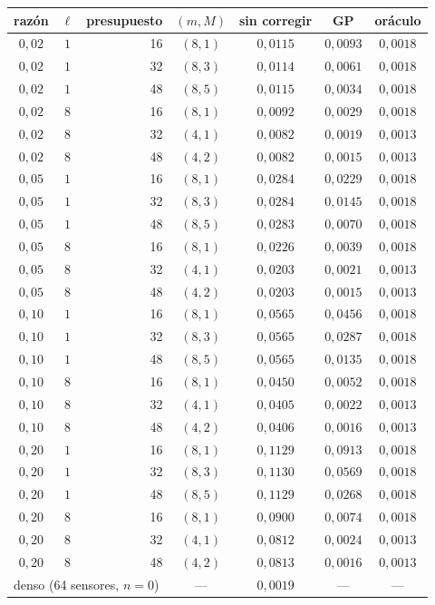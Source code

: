\begin{tabular}{ccrcccc}
\toprule
razón & $\ell$ & presupuesto & $(m, M)$ & sin corregir & GP & oráculo \\
\midrule
$0{,}02$ & $1$ & 16 & $(8, 1)$ & $0{,}0115$ & $0{,}0093$ & $0{,}0018$ \\
$0{,}02$ & $1$ & 32 & $(8, 3)$ & $0{,}0114$ & $0{,}0061$ & $0{,}0018$ \\
$0{,}02$ & $1$ & 48 & $(8, 5)$ & $0{,}0115$ & $0{,}0034$ & $0{,}0018$ \\
$0{,}02$ & $8$ & 16 & $(8, 1)$ & $0{,}0092$ & $0{,}0029$ & $0{,}0018$ \\
$0{,}02$ & $8$ & 32 & $(4, 1)$ & $0{,}0082$ & $0{,}0019$ & $0{,}0013$ \\
$0{,}02$ & $8$ & 48 & $(4, 2)$ & $0{,}0082$ & $0{,}0015$ & $0{,}0013$ \\
$0{,}05$ & $1$ & 16 & $(8, 1)$ & $0{,}0284$ & $0{,}0229$ & $0{,}0018$ \\
$0{,}05$ & $1$ & 32 & $(8, 3)$ & $0{,}0284$ & $0{,}0145$ & $0{,}0018$ \\
$0{,}05$ & $1$ & 48 & $(8, 5)$ & $0{,}0283$ & $0{,}0070$ & $0{,}0018$ \\
$0{,}05$ & $8$ & 16 & $(8, 1)$ & $0{,}0226$ & $0{,}0039$ & $0{,}0018$ \\
$0{,}05$ & $8$ & 32 & $(4, 1)$ & $0{,}0203$ & $0{,}0021$ & $0{,}0013$ \\
$0{,}05$ & $8$ & 48 & $(4, 2)$ & $0{,}0203$ & $0{,}0015$ & $0{,}0013$ \\
$0{,}10$ & $1$ & 16 & $(8, 1)$ & $0{,}0565$ & $0{,}0456$ & $0{,}0018$ \\
$0{,}10$ & $1$ & 32 & $(8, 3)$ & $0{,}0565$ & $0{,}0287$ & $0{,}0018$ \\
$0{,}10$ & $1$ & 48 & $(8, 5)$ & $0{,}0565$ & $0{,}0135$ & $0{,}0018$ \\
$0{,}10$ & $8$ & 16 & $(8, 1)$ & $0{,}0450$ & $0{,}0052$ & $0{,}0018$ \\
$0{,}10$ & $8$ & 32 & $(4, 1)$ & $0{,}0405$ & $0{,}0022$ & $0{,}0013$ \\
$0{,}10$ & $8$ & 48 & $(4, 2)$ & $0{,}0406$ & $0{,}0016$ & $0{,}0013$ \\
$0{,}20$ & $1$ & 16 & $(8, 1)$ & $0{,}1129$ & $0{,}0913$ & $0{,}0018$ \\
$0{,}20$ & $1$ & 32 & $(8, 3)$ & $0{,}1130$ & $0{,}0569$ & $0{,}0018$ \\
$0{,}20$ & $1$ & 48 & $(8, 5)$ & $0{,}1129$ & $0{,}0268$ & $0{,}0018$ \\
$0{,}20$ & $8$ & 16 & $(8, 1)$ & $0{,}0900$ & $0{,}0074$ & $0{,}0018$ \\
$0{,}20$ & $8$ & 32 & $(4, 1)$ & $0{,}0812$ & $0{,}0024$ & $0{,}0013$ \\
$0{,}20$ & $8$ & 48 & $(4, 2)$ & $0{,}0813$ & $0{,}0016$ & $0{,}0013$ \\
\midrule
\multicolumn{3}{l}{denso (64 sensores, $n = 0$)} & --- & $0{,}0019$ & --- & --- \\
\bottomrule
\end{tabular}
